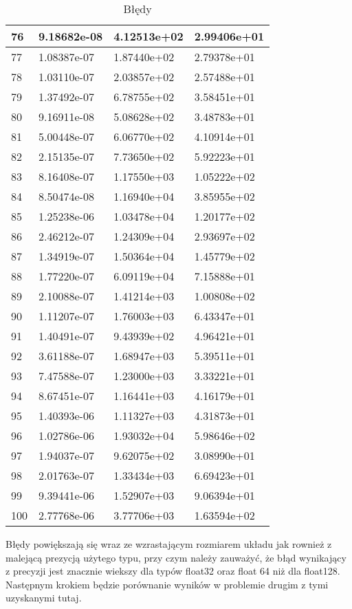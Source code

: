 \documentclass{article}
\begin{document}
\begin{table}[H]
{\begin{tabular}{|l|l|l|l|}
76 & 9.18682e-08 & 4.12513e+02 & 2.99406e+01 \\ \hline
77 & 1.08387e-07 & 1.87440e+02 & 2.79378e+01 \\ \hline
78 & 1.03110e-07 & 2.03857e+02 & 2.57488e+01 \\ \hline
79 & 1.37492e-07 & 6.78755e+02 & 3.58451e+01 \\ \hline
80 & 9.16911e-08 & 5.08628e+02 & 3.48783e+01 \\ \hline
81 & 5.00448e-07 & 6.06770e+02 & 4.10914e+01 \\ \hline
82 & 2.15135e-07 & 7.73650e+02 & 5.92223e+01 \\ \hline
83 & 8.16408e-07 & 1.17550e+03 & 1.05222e+02 \\ \hline
84 & 8.50474e-08 & 1.16940e+04 & 3.85955e+02 \\ \hline
85 & 1.25238e-06 & 1.03478e+04 & 1.20177e+02 \\ \hline
86 & 2.46212e-07 & 1.24309e+04 & 2.93697e+02 \\ \hline
87 & 1.34919e-07 & 1.50364e+04 & 1.45779e+02 \\ \hline
88 & 1.77220e-07 & 6.09119e+04 & 7.15888e+01 \\ \hline
89 & 2.10088e-07 & 1.41214e+03 & 1.00808e+02 \\ \hline
90 & 1.11207e-07 & 1.76003e+03 & 6.43347e+01 \\ \hline
91 & 1.40491e-07 & 9.43939e+02 & 4.96421e+01 \\ \hline
92 & 3.61188e-07 & 1.68947e+03 & 5.39511e+01 \\ \hline
93 & 7.47588e-07 & 1.23000e+03 & 3.33221e+01 \\ \hline
94 & 8.67451e-07 & 1.16441e+03 & 4.16179e+01 \\ \hline
95 & 1.40393e-06 & 1.11327e+03 & 4.31873e+01 \\ \hline
96 & 1.02786e-06 & 1.93032e+04 & 5.98646e+02 \\ \hline
97 & 1.94037e-07 & 9.62075e+02 & 3.08990e+01 \\ \hline
98 & 2.01763e-07 & 1.33434e+03 & 6.69423e+01 \\ \hline
99 & 9.39441e-06 & 1.52907e+03 & 9.06394e+01 \\ \hline
100 & 2.77768e-06 & 3.77706e+03 & 1.63594e+02 \\ \hline
\end{tabular}
\hspace*{-2.5cm}
}
\caption{Błędy}
\end{table}

Błędy powiększają się wraz ze wzrastającym rozmiarem układu jak rownież z malejącą prezycją użytego typu, przy czym należy
zauważyć, że błąd wynikający z precyzji jest znacznie wiekszy dla typów float32 oraz float 64 niż dla float128. Następnym krokiem
będzie porównanie wyników w problemie drugim z tymi uzyskanymi tutaj.
\end{document}
